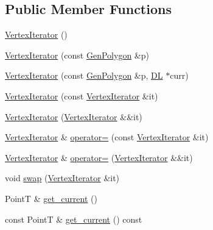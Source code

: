 \subsection*{Public Member Functions}
\begin{DoxyCompactItemize}
\item 
\hyperlink{class_designar_1_1_gen_polygon_1_1_vertex_iterator_af12ab8f901a5d0fe153a8a5ce8fd9639}{Vertex\+Iterator} ()
\item 
\hyperlink{class_designar_1_1_gen_polygon_1_1_vertex_iterator_a5fd0787c03b2663aa377fc7dc6b1b782}{Vertex\+Iterator} (const \hyperlink{class_designar_1_1_gen_polygon}{Gen\+Polygon} \&p)
\item 
\hyperlink{class_designar_1_1_gen_polygon_1_1_vertex_iterator_a3d95cc56c6e46ea79c388e0e024b2be7}{Vertex\+Iterator} (const \hyperlink{class_designar_1_1_gen_polygon}{Gen\+Polygon} \&p, \hyperlink{class_designar_1_1_d_l}{DL} $\ast$curr)
\item 
\hyperlink{class_designar_1_1_gen_polygon_1_1_vertex_iterator_a21157bfe51250c44cc0c7a85424a9a97}{Vertex\+Iterator} (const \hyperlink{class_designar_1_1_gen_polygon_1_1_vertex_iterator}{Vertex\+Iterator} \&it)
\item 
\hyperlink{class_designar_1_1_gen_polygon_1_1_vertex_iterator_a1686e78e3ea5c376e24ff12a16e57682}{Vertex\+Iterator} (\hyperlink{class_designar_1_1_gen_polygon_1_1_vertex_iterator}{Vertex\+Iterator} \&\&it)
\item 
\hyperlink{class_designar_1_1_gen_polygon_1_1_vertex_iterator}{Vertex\+Iterator} \& \hyperlink{class_designar_1_1_gen_polygon_1_1_vertex_iterator_a7ca1c2552ea82acbf3e893b6cb554728}{operator=} (const \hyperlink{class_designar_1_1_gen_polygon_1_1_vertex_iterator}{Vertex\+Iterator} \&it)
\item 
\hyperlink{class_designar_1_1_gen_polygon_1_1_vertex_iterator}{Vertex\+Iterator} \& \hyperlink{class_designar_1_1_gen_polygon_1_1_vertex_iterator_a4781c8fdb3a9d942714f395136fe85a8}{operator=} (\hyperlink{class_designar_1_1_gen_polygon_1_1_vertex_iterator}{Vertex\+Iterator} \&\&it)
\item 
void \hyperlink{class_designar_1_1_gen_polygon_1_1_vertex_iterator_a7bf89e1ca4095b74949f06937d03bb20}{swap} (\hyperlink{class_designar_1_1_gen_polygon_1_1_vertex_iterator}{Vertex\+Iterator} \&it)
\item 
PointT \& \hyperlink{class_designar_1_1_gen_polygon_1_1_vertex_iterator_acf3d94036e4b8cc224f5975625865263}{get\+\_\+current} ()
\item 
const PointT \& \hyperlink{class_designar_1_1_gen_polygon_1_1_vertex_iterator_a2a36a8eb3d301865dd014e9036c20186}{get\+\_\+current} () const

\end{DoxyCompactItemize}
